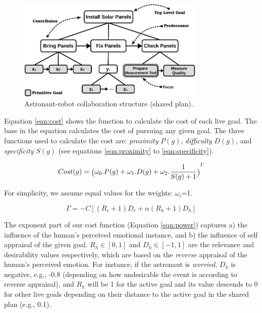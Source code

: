 \begin{figure}[tbh]
  \centering
  \vspace*{-1mm}
  \includegraphics[width=0.8\textwidth]{figure/collaborationStructure-croped.pdf}
  \caption{{\fontsize{9}{9}\selectfont Astronaut-robot collaboration structure
  (shared plan).}}
  \label{fig:taskModel}
  \vspace*{-3mm}
\end{figure}

Equation \ref{eqn:cost} shows the function to calculate the cost of each
live goal. The base in the equation calculates the cost of pursuing any given
goal. The three functions used to calculate the cost are:
\textit{proximity} $P(g)$, \textit{difficulty} $D(g)$, and \textit{specificity}
$S(g)$ (see equations \ref{eqn:proximity} to \ref{eqn:specificity}).

\begin{equation}
{\fontsize{6}{9}\selectfont Cost(g) =
\big(\omega_0.P(g)+\omega_1.D(g)+\omega_2.\frac{1}{S(g)+1}\big)}^{\Gamma}
\label{eqn:cost}
\end{equation}

\noindent For simplicity, we assume equal values for the weights: $\omega_i$=1.

\begin{equation}
\Gamma=-C[(R_r+1)D_r + \alpha(R_h+1)D_h]
\label{eqn:power}
\end{equation}

The exponent part of our cost function (Equation \ref{eqn:power}) captures a)
the influence of the human's perceived emotional instance, and b) the influence
of self appraisal of the given goal. $R_h\in[0,1]$ and $D_h\in[-1,1]$ are the
relevance and desirability values respectively, which are based on the
\textit{reverse} appraisal of the human's perceived emotion. For instance, if
the astronaut is \textit{worried}, $D_h$ is negative, e.g., -0.8 (depending on
how undesirable the event is according to reverse appraisal), and $R_h$ will be
1 for the active goal and its value descends to 0 for other live goals depending
on their distance to the active goal in the shared plan (e.g., 0.1).

